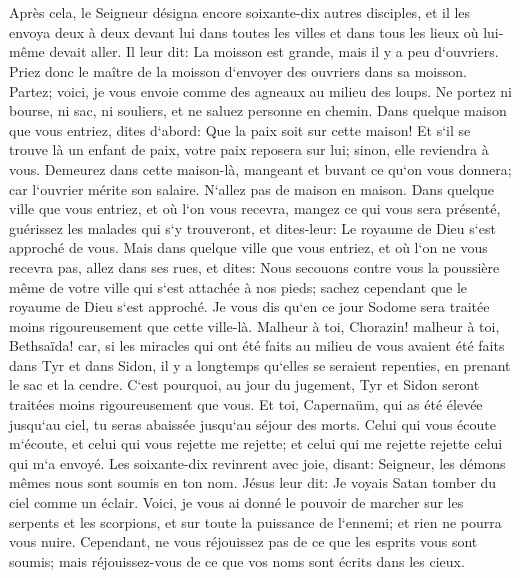\chapter{}

\verse Après cela, le Seigneur désigna encore soixante-dix autres disciples, et il les envoya deux à deux devant lui dans toutes les villes et dans tous les lieux où lui-même devait aller. 
\verse Il leur dit: La moisson est grande, mais il y a peu d`ouvriers. Priez donc le maître de la moisson d`envoyer des ouvriers dans sa moisson. 
\verse Partez; voici, je vous envoie comme des agneaux au milieu des loups. 
\verse Ne portez ni bourse, ni sac, ni souliers, et ne saluez personne en chemin. 
\verse Dans quelque maison que vous entriez, dites d`abord: Que la paix soit sur cette maison! 
\verse Et s`il se trouve là un enfant de paix, votre paix reposera sur lui; sinon, elle reviendra à vous. 
\verse Demeurez dans cette maison-là, mangeant et buvant ce qu`on vous donnera; car l`ouvrier mérite son salaire. N`allez pas de maison en maison. 
\verse Dans quelque ville que vous entriez, et où l`on vous recevra, mangez ce qui vous sera présenté, 
\verse guérissez les malades qui s`y trouveront, et dites-leur: Le royaume de Dieu s`est approché de vous. 
\verse Mais dans quelque ville que vous entriez, et où l`on ne vous recevra pas, allez dans ses rues, et dites: 
\verse Nous secouons contre vous la poussière même de votre ville qui s`est attachée à nos pieds; sachez cependant que le royaume de Dieu s`est approché. 
\verse Je vous dis qu`en ce jour Sodome sera traitée moins rigoureusement que cette ville-là. 
\verse Malheur à toi, Chorazin! malheur à toi, Bethsaïda! car, si les miracles qui ont été faits au milieu de vous avaient été faits dans Tyr et dans Sidon, il y a longtemps qu`elles se seraient repenties, en prenant le sac et la cendre. 
\verse C`est pourquoi, au jour du jugement, Tyr et Sidon seront traitées moins rigoureusement que vous. 
\verse Et toi, Capernaüm, qui as été élevée jusqu`au ciel, tu seras abaissée jusqu`au séjour des morts. 
\verse Celui qui vous écoute m`écoute, et celui qui vous rejette me rejette; et celui qui me rejette rejette celui qui m`a envoyé. 
\verse Les soixante-dix revinrent avec joie, disant: Seigneur, les démons mêmes nous sont soumis en ton nom. 
\verse Jésus leur dit: Je voyais Satan tomber du ciel comme un éclair. 
\verse Voici, je vous ai donné le pouvoir de marcher sur les serpents et les scorpions, et sur toute la puissance de l`ennemi; et rien ne pourra vous nuire. 
\verse Cependant, ne vous réjouissez pas de ce que les esprits vous sont soumis; mais réjouissez-vous de ce que vos noms sont écrits dans les cieux. 
